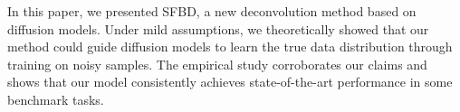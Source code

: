 In this paper, we presented SFBD, a new deconvolution method based on diffusion models. Under mild assumptions, we theoretically showed that our method could guide diffusion models to learn the true data distribution through training on noisy samples. The empirical study corroborates our claims and shows that our model consistently achieves state-of-the-art performance in some benchmark tasks. 
